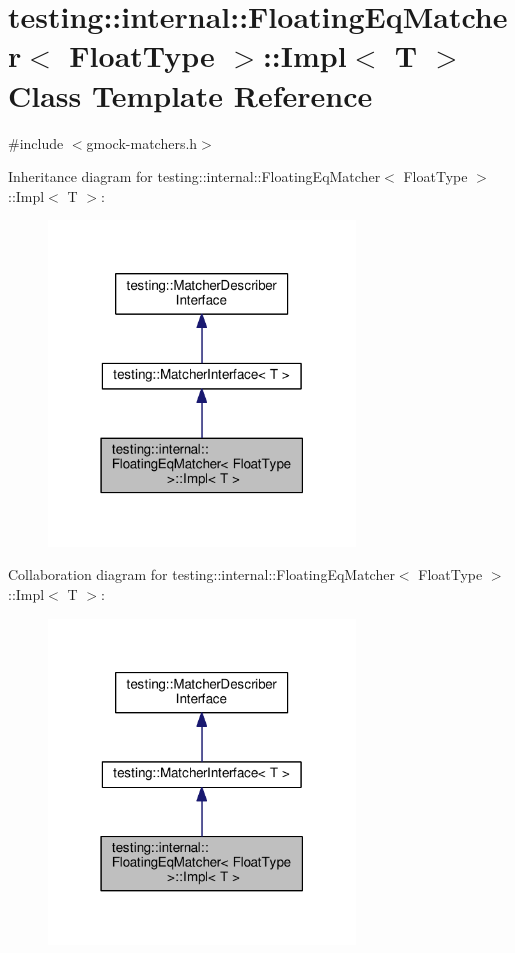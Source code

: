\hypertarget{classtesting_1_1internal_1_1FloatingEqMatcher_1_1Impl}{}\section{testing\+:\+:internal\+:\+:Floating\+Eq\+Matcher$<$ Float\+Type $>$\+:\+:Impl$<$ T $>$ Class Template Reference}
\label{classtesting_1_1internal_1_1FloatingEqMatcher_1_1Impl}


{\ttfamily \#include $<$gmock-\/matchers.\+h$>$}



Inheritance diagram for testing\+:\+:internal\+:\+:Floating\+Eq\+Matcher$<$ Float\+Type $>$\+:\+:Impl$<$ T $>$\+:
\nopagebreak
\begin{figure}[H]
\begin{center}
\leavevmode
\includegraphics[width=231pt]{classtesting_1_1internal_1_1FloatingEqMatcher_1_1Impl__inherit__graph}
\end{center}
\end{figure}


Collaboration diagram for testing\+:\+:internal\+:\+:Floating\+Eq\+Matcher$<$ Float\+Type $>$\+:\+:Impl$<$ T $>$\+:
\nopagebreak
\begin{figure}[H]
\begin{center}
\leavevmode
\includegraphics[width=231pt]{classtesting_1_1internal_1_1FloatingEqMatcher_1_1Impl__coll__graph}
\end{center}
\end{figure}
